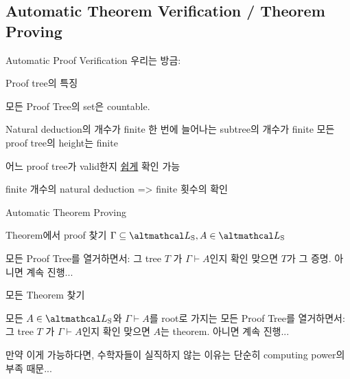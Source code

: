 \documentclass[../231120_msquare_computational-logic.tex]{subfiles}
\begin{document}
\subsection{Automatic Theorem Verification / Theorem Proving}

\begin{frame}{Automatic Proof Verification}
    우리는 방금:
    \begin{center}
    \end{center}
    \begin{exampleblock}{Proof tree의 특징}
        \begin{enumerate}
            \ii 모든 Proof Tree의 set은 countable.
                \begin{itemize}
                    \ii Natural deduction의 개수가 finite
                    \ii 한 번에 늘어나는 subtree의 개수가 finite
                    \ii 모든 proof tree의 height는 finite
                \end{itemize}
            \ii 어느 proof tree가 valid한지 \ul{쉽게} 확인 가능
                \begin{itemize}
                    \ii finite 개수의 natural deduction => finite 횟수의 확인
                \end{itemize}
        \end{enumerate}
    \end{exampleblock}
\end{frame}

\begin{frame}{Automatic Theorem Proving}
    \begin{exampleblock}{Theorem에서 proof 찾기}
        \(\Gamma \subseteq \LS, A \in \LS\)
        \begin{enumerate}
            \ii 모든 Proof Tree를 열거하면서:
            \ii 그 tree \(T\) 가 \(\Gamma \vdash A\)인지 확인
            \ii 맞으면 \(T\)가 그 증명. 아니면 계속 진행...
        \end{enumerate}
    \end{exampleblock}
    \pause

    \begin{exampleblock}{모든 Theorem 찾기}
        \begin{enumerate}
            \ii 모든 \(A \in \LS\)와 \(\Gamma \vdash A\)를 root로 가지는 모든 Proof Tree를 열거하면서:
            \ii 그 tree \(T\) 가 \(\Gamma \vdash A\)인지 확인
            \ii 맞으면 \(A\)는 theorem. 아니면 계속 진행...
        \end{enumerate} 
        \pause
        만약 이게 가능하다면, 수학자들이 실직하지 않는 이유는 단순히 computing power의 부족 때문...
    \end{exampleblock}
\end{frame}
\end{document}
